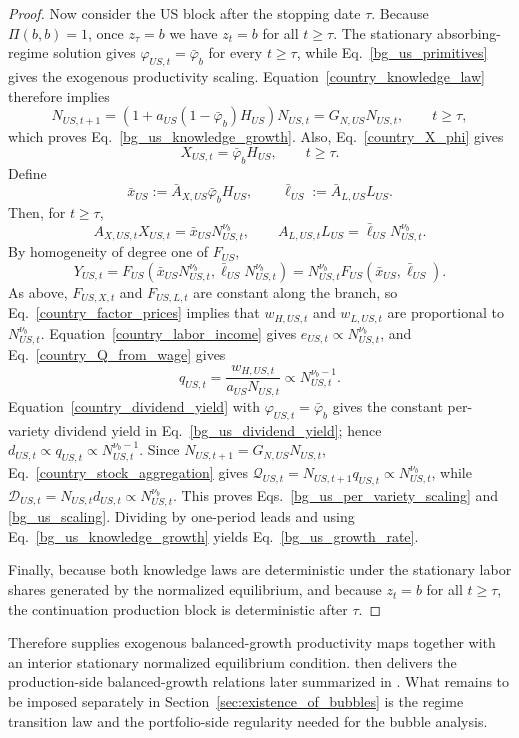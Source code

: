 \documentclass{article}
\begin{document}
\begin{proof}
Now consider the US block after the stopping date $\tau$. Because $\Pi(b,b)=1$, once $z_\tau=b$ we have $z_t=b$ for all $t\ge \tau$. The stationary absorbing-regime solution gives $\varphi_{US,t}=\bar\varphi_b$ for every $t\ge \tau$, while Eq.~\eqref{bg_us_primitives} gives the exogenous productivity scaling. Equation~\eqref{country_knowledge_law} therefore implies
\[
N_{US,t+1}=(1+a_{US}(1-\bar\varphi_b)H_{US})N_{US,t}=G_{N,US}N_{US,t},
\qquad
t\ge \tau,
\]
which proves Eq.~\eqref{bg_us_knowledge_growth}. Also, Eq.~\eqref{country_X_phi} gives
\[
X_{US,t}=\bar\varphi_b H_{US},
\qquad
t\ge \tau.
\]
Define
\[
\bar x_{US}:=\bar A_{X,US}\bar\varphi_b H_{US},
\qquad
\bar \ell_{US}:=\bar A_{L,US}L_{US}.
\]
Then, for $t\ge \tau$,
\[
A_{X,US,t}X_{US,t}=\bar x_{US}N_{US,t}^{\nu_b},
\qquad
A_{L,US,t}L_{US}=\bar \ell_{US}N_{US,t}^{\nu_b}.
\]
By homogeneity of degree one of $F_{US}$,
\[
Y_{US,t}
=
F_{US}(\bar x_{US}N_{US,t}^{\nu_b},\bar \ell_{US}N_{US,t}^{\nu_b})
=
N_{US,t}^{\nu_b}F_{US}(\bar x_{US},\bar \ell_{US}).
\]
As above, $F_{US,X,t}$ and $F_{US,L,t}$ are constant along the branch, so Eq.~\eqref{country_factor_prices} implies that $w_{H,US,t}$ and $w_{L,US,t}$ are proportional to $N_{US,t}^{\nu_b}$. Equation~\eqref{country_labor_income} gives $e_{US,t}\propto N_{US,t}^{\nu_b}$, and Eq.~\eqref{country_Q_from_wage} gives
\[
q_{US,t}=\frac{w_{H,US,t}}{a_{US}N_{US,t}}\propto N_{US,t}^{\nu_b-1}.
\]
Equation~\eqref{country_dividend_yield} with $\varphi_{US,t}=\bar\varphi_b$ gives the constant per-variety dividend yield in Eq.~\eqref{bg_us_dividend_yield}; hence $d_{US,t}\propto q_{US,t}\propto N_{US,t}^{\nu_b-1}$. Since $N_{US,t+1}=G_{N,US}N_{US,t}$, Eq.~\eqref{country_stock_aggregation} gives $\mathcal Q_{US,t}=N_{US,t+1}q_{US,t}\propto N_{US,t}^{\nu_b}$, while $\mathcal D_{US,t}=N_{US,t}d_{US,t}\propto N_{US,t}^{\nu_b}$. This proves Eqs.~\eqref{bg_us_per_variety_scaling} and \eqref{bg_us_scaling}. Dividing by one-period leads and using Eq.~\eqref{bg_us_knowledge_growth} yields Eq.~\eqref{bg_us_growth_rate}.

Finally, because both knowledge laws are deterministic under the stationary labor shares generated by the normalized equilibrium, and because $z_t=b$ for all $t\ge \tau$, the continuation production block is deterministic after $\tau$.
\end{proof}

Therefore  supplies exogenous balanced-growth productivity maps together with an interior stationary normalized equilibrium condition.  then delivers the production-side balanced-growth relations later summarized in . What remains to be imposed separately in Section~\ref{sec:existence_of_bubbles} is the regime transition law and the portfolio-side regularity needed for the bubble analysis.
\end{document}
